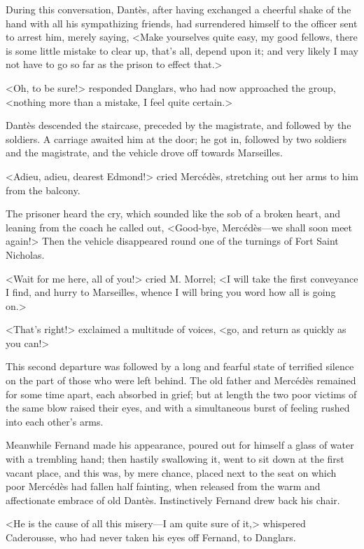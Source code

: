  During this conversation, Dantès, after having exchanged a cheerful shake of the hand with all his sympathizing friends, had surrendered himself to the officer sent to arrest him, merely saying, <Make yourselves quite easy, my good fellows, there is some little mistake to clear up, that's all, depend upon it; and very likely I may not have to go so far as the prison to effect that.>  
 
 <Oh, to be sure!> responded Danglars, who had now approached the group, <nothing more than a mistake, I feel quite certain.> 

 Dantès descended the staircase, preceded by the magistrate, and followed by the soldiers. A carriage awaited him at the door; he got in, followed by two soldiers and the magistrate, and the vehicle drove off towards Marseilles. 

 <Adieu, adieu, dearest Edmond!> cried Mercédès, stretching out her arms to him from the balcony. 

 The prisoner heard the cry, which sounded like the sob of a broken heart, and leaning from the coach he called out, <Good-bye, Mercédès—we shall soon meet again!> Then the vehicle disappeared round one of the turnings of Fort Saint Nicholas. 

 <Wait for me here, all of you!> cried M. Morrel; <I will take the first conveyance I find, and hurry to Marseilles, whence I will bring you word how all is going on.> 

 <That's right!> exclaimed a multitude of voices, <go, and return as quickly as you can!> 

 This second departure was followed by a long and fearful state of terrified silence on the part of those who were left behind. The old father and Mercédès remained for some time apart, each absorbed in grief; but at length the two poor victims of the same blow raised their eyes, and with a simultaneous burst of feeling rushed into each other's arms. 

 Meanwhile Fernand made his appearance, poured out for himself a glass of water with a trembling hand; then hastily swallowing it, went to sit down at the first vacant place, and this was, by mere chance, placed next to the seat on which poor Mercédès had fallen half fainting, when released from the warm and affectionate embrace of old Dantès. Instinctively Fernand drew back his chair. 

 <He is the cause of all this misery—I am quite sure of it,> whispered Caderousse, who had never taken his eyes off Fernand, to Danglars. 

